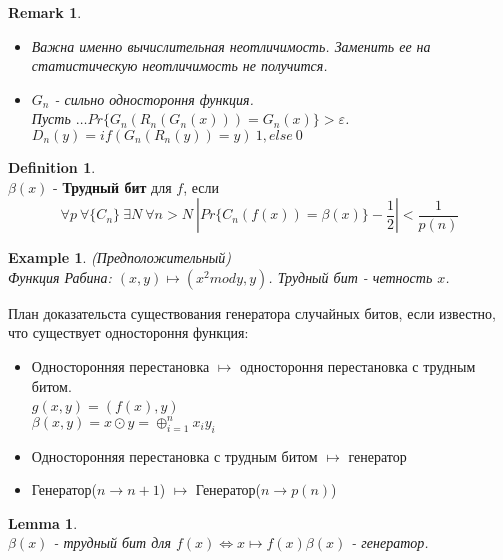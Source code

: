 \documentclass[a4paper]{article}
\theoremstyle{definition}
\newtheorem{definition}{Definition}
\theoremstyle{plain}
\newtheorem{lemma}{Lemma}
\newtheorem{remark}{Remark}
\newtheorem{example}{Example}
\begin{document}
\begin{remark}~\\
	\begin{itemize}
		\item Важна именно вычислительная неотличимость. Заменить ее на статистическую неотличимость не получится.
		\item $G_n$ - сильно одностороння функция.~\\	
		Пусть $\ldots Pr\{G_n(R_n(G_n(x))) = G_n(x)\} > \varepsilon$.~\\
		$D_n(y) = if(G_n(R_n(y)) = y)\ 1, else\ 0$
	\end{itemize}
\end{remark}

\begin{definition}~\\
	$\beta(x)$ - \textbf{Трудный бит} для $f$, если
	$$
		\forall p\ \forall \{C_n\}\ \exists N\ \forall n > N\ |Pr\{C_n(f(x)) = \beta(x)\} - \frac{1}{2}| < \frac{1}{p(n)}	
	$$
\end{definition}

\begin{example}(Предположительный)~\\
	Функция Рабина: $(x, y) \mapsto (x^2 mod y, y)$. Трудный бит - четность $x$. 
\end{example}

\noindent План доказательста существования генератора случайных битов, если известно, что существует одностороння функция:
\begin{itemize}
	\item Односторонняя перестановка $\mapsto$ одностороння перестановка с трудным битом.~\\
	$g(x, y) = (f(x), y)$~\\
	$\beta(x, y) = x \odot y = \oplus_{i = 1}^{n} x_i y_i$
	\item Односторонняя перестановка с трудным битом $\mapsto$ генератор
	\item Генератор($n \rightarrow n + 1$) $\mapsto$ Генератор($n \rightarrow p(n)$)
\end{itemize}

\begin{lemma}~\\
	$\beta(x)$ - трудный бит для $f(x) \Leftrightarrow x \mapsto f(x)\beta(x)$ - генератор.
\end{lemma}
\end{document}
